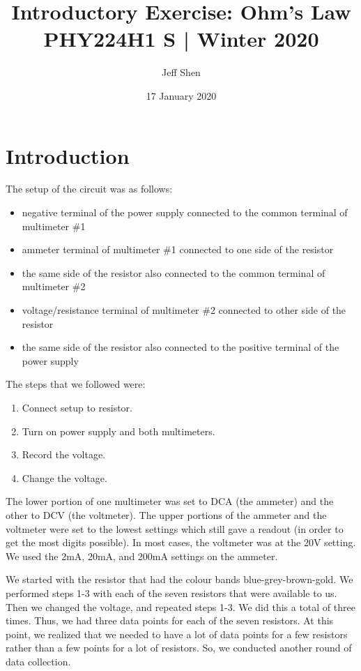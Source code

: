 \documentclass[11pt]{article}
\title{\vspace{-1cm}Introductory Exercise: Ohm's Law\\[0.4cm]\large{PHY224H1 S | Winter 2020}\vspace{-0.5em}}
\author{Jeff Shen}
\date{\vspace{-0.3em}\normalsize17 January 2020}
\begin{document}
\maketitle

\section{Introduction}

The setup of the circuit was as follows:
\begin{itemize}
    \item negative terminal of the power supply connected to the common terminal  of multimeter \#1
    \item ammeter terminal of multimeter \#1 connected to one side of the resistor
    \item the same side of the resistor also connected to the common terminal of multimeter \#2
    \item voltage/resistance terminal of multimeter \#2 connected to other side of the resistor
    \item the same side of the resistor also connected to the positive terminal of the power supply
\end{itemize}

The steps that we followed were:
\begin{enumerate}
    \item Connect setup to resistor.
    \item Turn on power supply and both multimeters.
    \item Record the voltage. 
    \item Change the voltage. 
\end{enumerate}

The lower portion of one multimeter was set to DCA (the ammeter) and the other to DCV (the voltmeter). The upper portions of the ammeter and the voltmeter were set to the lowest settings which still gave a readout (in order to get the most digits possible). In most cases, the voltmeter was at the 20V setting. We used the 2mA, 20mA, and 200mA settings on the ammeter. 

We started with the resistor that had the colour bands blue-grey-brown-gold. We performed steps 1-3 with each of the seven resistors that were available to us. Then we changed the voltage, and repeated steps 1-3. We did this a total of three times. Thus, we had three data points for each of the seven resistors. At this point, we realized that we needed to have a lot of data points for a few resistors rather than a few points for a lot of resistors. So, we conducted another round of data collection. 
\end{document}

